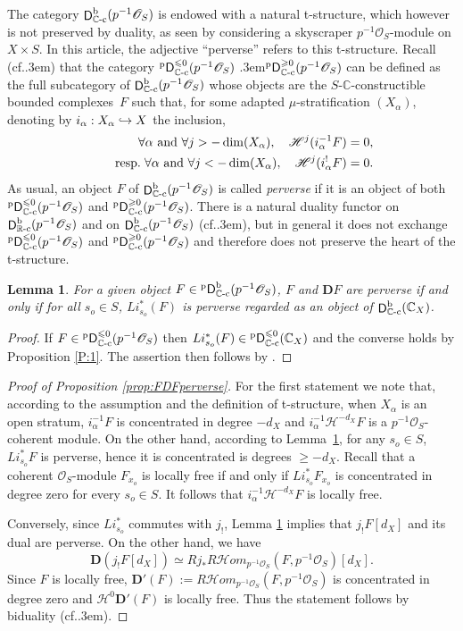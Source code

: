 \documentclass[english]{smfart}
\numberwithin{subsection}{section}
\def\shh{\mathcal{H}}
\def\shh{\mathcal{H}}
\def\sho{\mathcal{O}}\let\cO\sho
\newcommand{\C}{\mathbb{C}}\let\CC\C
\newcommand{\R}{\mathbb{R}}\let\RR\R
\newcommand{\bD}{\boldsymbol{D}}
\newcommand{\shhom}{\mathcal{H}\!\mathit{om}}\let\ho\shhom
\newcommand{\rb}{\mathrm{b}}
\newcommand{\cc}{{\C\textup{-c}}}
\newcommand{\rc}{{\R\textup{-c}}}
\newcommand{\XS}{X\times S}
\DeclareMathOperator{\pD}{{}^\mathrm{p}\mathsf{D}}
\DeclareMathOperator{\rD}{\mathsf{D}}
\let\leq\leqslant
\let\geq\geqslant
\def\cf{cf.\kern.3em}
\def\resp{\text{resp.}\kern.3em}
\newcommand{\pOS}{p^{-1}\sho_S}
\numberwithin{equation}{section}
\theoremstyle{plain}
\newtheorem{lemma}[equation]{Lemma}
\theoremstyle{definition}
\def\to{\mathchoice{\longrightarrow}{\rightarrow}{\rightarrow}{\rightarrow}}
\def\hto{\mathrel{\lhook\joinrel\to}}
\begin{document}
The category $\rD^\rb_\cc(\pOS)$ is endowed with a natural t-structure, which however is not preserved by duality, as seen by considering a skyscraper $\pOS$-module on $\XS$. In this article, the adjective ``perverse'' refers to this t-structure. Recall (\cf \cite[Lem.\,2.5]{MF-S12}) that the category $\pD^{\leq0}_\cc(\pOS)$ \resp $\pD^{\geq0}_\cc(\pOS)$ can be defined as the full subcategory of $\rD^\rb_\cc(\pOS)$ whose objects are the $S$-$\C$-constructible bounded complexes~$F$ such that, for some adapted $\mu$-stratification $(X_\alpha)$, denoting by \hbox{$i_\alpha:X_\alpha\hto X$} the inclusion,
\begin{align*}
\forall\alpha\text{ and }\forall j>-\dim(X_\alpha),\quad\shh^j(i^{-1}_\alpha F)&=0,\\
\tag*{\resp}
\forall \alpha\text{ and }\forall j<-\dim(X_\alpha),\quad\shh^j(i^{!}_\alpha F)&=0.
\end{align*}
As usual, an object $F$ of $\rD^\rb_\cc(\pOS)$ is called \emph{perverse} if it is an object of both $\pD^{\leq0}_\cc(\pOS)$ and $\pD^{\geq0}_\cc(\pOS)$. There is a natural duality functor on $\rD^\rb_\rc(\pOS)$ and on $\rD^\rb_\cc(\pOS)$ (\cf\cite[Prop.\,2.23]{MF-S12}), but in general it does not exchange $\pD^{\leq0}_\cc(\pOS)$ and $\pD^{\geq0}_\cc(\pOS)$ and therefore does not preserve the heart of the t-structure.

\begin{lemma}\label{perv}
For a given object $F\in \pD^\rb_\cc(\pOS)$,
$F$ and $\bD F$ are perverse if and only if for all $s_o\in S$, $Li^*_{s_o}(F)$ is perverse regarded as an object of $\rD^\rb_\cc(\CC_X)$.
\end{lemma}

\begin{proof}
If $F\in \pD^{\leq 0}_\cc(\pOS)$ then $Li^*_{s_o}(F)\in \pD^{\leq 0}_\cc(\CC_X)$ and the converse holds by Proposition \ref{P:1}. The assertion then follows by \cite[Prop.\,2.28]{MF-S12}.
\end{proof}

\begin{proof}[Proof of Proposition \ref{prop:FDFperverse}]
For the first statement we note that, according to the assumption and the definition of t-structure, when $X_\alpha$ is an open stratum, $i^{-1}_{\alpha} F$ is concentrated in degree $-d_X$ and $i^{-1}_{\alpha}\shh^{-d_X}F$ is a $\pOS$-coherent module. On the other hand, according to Lemma~\ref{perv}, for any $s_o\in S$, $Li^*_{s_o} F$ is perverse, hence it is concentrated is degrees $\geq -d_X$. Recall that a coherent $\sho_S$-module $F_{x_o}$ is locally free if and only if $Li^*_{s_o} F_{x_o}$ is concentrated in degree zero for every $s_o\in S$. It follows that $i^{-1}_{\alpha}\shh^{-d_X} F$ is locally free.

Conversely, since $Li^*_{s_o}$ commutes with $j_!$, Lemma \ref{perv} implies that $j_!F[d_X]$ and its dual are perverse. On the other hand, we have
$$\bD(j_!F[d_X])\simeq R j_{\ast} R\shhom_{\pOS}(F,\pOS)[d_X].$$
Since $F$ is locally free, $\bD'(F):=R\shhom_{\pOS}(F,\pOS)$ is concentrated in degree zero and $\shh^0 \bD'(F)$ is locally free. Thus the statement follows by biduality (\cf \cite[Prop.\,2.23]{MF-S12}).
\end{proof}
\end{document}
